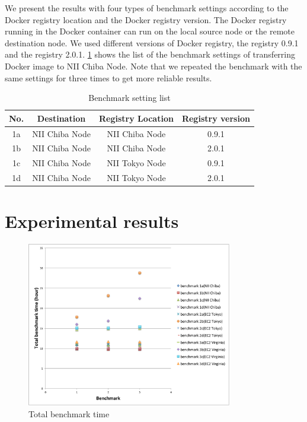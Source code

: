 \documentclass{ieicej}
\begin{document}
We present the results with four types of benchmark settings according to the Docker registry location and the Docker registry version.
The Docker registry running in the Docker container can run on the local source node or the remote destination node.
We used different versions of Docker registry, the registry 0.9.1 and the registry 2.0.1.
\cref{bench_set_l} shows the list of the benchmark settings of transferring Docker image to NII Chiba Node.
Note that we repeated the benchmark with the same settings for three times to get more reliable results.

\begin{table}
	\begin{tabular}{|c|c|c|c|}
\hline
    No. & Destination    & Registry Location & Registry version \\
\hline
    1a  & NII Chiba Node & NII Chiba Node    & 0.9.1 \\
\hline
    1b  & NII Chiba Node & NII Chiba Node    & 2.0.1 \\
\hline
    1c  & NII Chiba Node & NII Tokyo Node    & 0.9.1 \\
\hline
    1d  & NII Chiba Node & NII Tokyo Node    & 2.0.1 \\
\hline
	\end{tabular}
  \caption{Benchmark setting list}
  \label{bench_set_l}
\end{table}


\section{Experimental results}
\begin{figure}
  \begin{center}
  \includegraphics[width=0.8\textwidth,natwidth=1000,natheight=800]{2_Total_benchmark_time.pdf}
  \end{center}
  \caption{Total benchmark time}
  \label{t_bench_t}
\end{figure}
\end{document}
